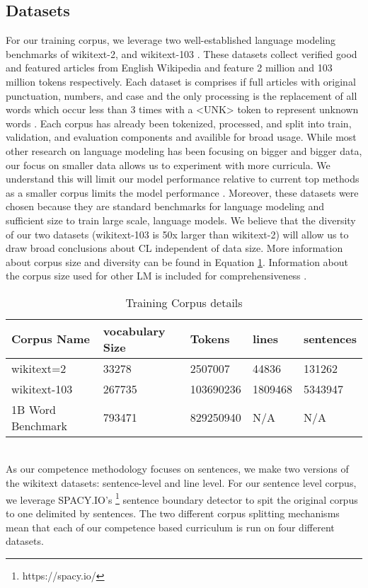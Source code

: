 \subsection{Datasets}
For our training corpus, we leverage two well-established language modeling benchmarks of wikitext-2, and wikitext-103 \cite{Merity2016PointerSM}. These datasets collect verified good and featured articles from English Wikipedia and feature 2 million and 103 million tokens respectively. Each dataset is comprises if full articles with original punctuation, numbers, and case and the only processing is the replacement of all words which occur less than 3 times with a <UNK> token to represent unknown words . Each corpus has already been tokenized, processed, and split into train, validation, and evaluation components and availible for broad usage. While most other research on language modeling has been focusing on bigger and bigger data, our focus on smaller data allows us to experiment with more curricula. We understand this will limit our model performance relative to current top methods as a smaller corpus limits the model performance \cite{Kaplan2020ScalingLF}. Moreover, these datasets were chosen because they are standard benchmarks for language modeling and sufficient size to train large scale, language models. We believe that the diversity of our two datasets (wikitext-103 is 50x larger than wikitext-2) will allow us to draw broad conclusions about CL independent of data size. More information about corpus size and diversity can be found in Equation \ref{table:corpussize}. Information about the corpus size used for other LM is included for comprehensiveness \cite{Chelba2014OneBW}.\\
\begin{table}[h!]
\begin{tabular}{|l|l|l|l|l|} \hline
\textbf{Corpus Name} & \textbf{vocabulary Size} & \textbf{Tokens} & \textbf{lines} & \textbf{sentences} \\ \hline
wikitext=2 & 33278 & 2507007 & 44836 & 131262 \\ \hline
wikitext-103 & 267735 & 103690236 & 1809468  & 5343947 \\ \hline
1B Word Benchmark & 793471 & 829250940 & N/A & N/A \\ \hline
\end{tabular}
\caption{Training Corpus details}
\label{table:corpussize}
\end{table} \\
As our competence methodology focuses on sentences, we make two versions of the wikitext datasets: sentence-level and line level. For our sentence level corpus, we leverage SPACY.IO's \cite{spacy2} \footnote{https://spacy.io/} sentence boundary detector to spit the original corpus to one delimited by sentences. The two different corpus splitting mechanisms mean that each of our competence based curriculum is run on four different datasets.

